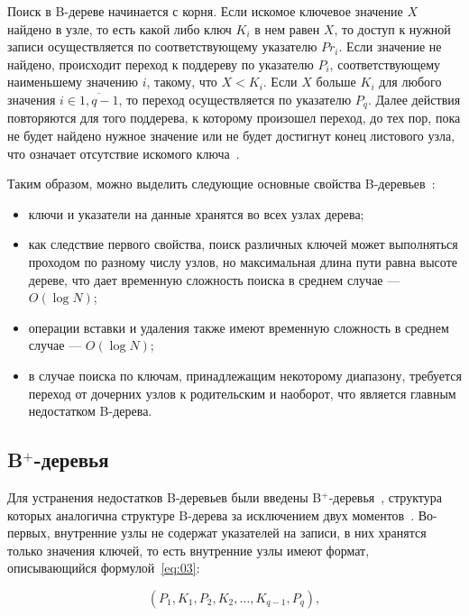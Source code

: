 Поиск в B-дереве начинается с корня. Если искомое ключевое значение $X$ найдено
в узле, то есть какой либо ключ $K_i$ в нем равен $X$, то доступ к нужной записи
осуществляется по соответствующему указателю $Pr_i$. Если значение не найдено,
происходит переход к поддереву по указателю $P_i$, соответствующему наименьшему
значению $i$, такому, что $X < K_i$. Если $X$ больше $K_i$ для любого значения
$i \in \overline{1, q - 1}$, то переход осуществляется по указателю $P_q$.
Далее действия повторяются для того поддерева, к которому произошел переход, до
тех пор, пока не будет найдено нужное значение или не будет достигнут конец
листового узла, что означает отсутствие искомого ключа~\cite{arki}.

Таким образом, можно выделить следующие основные свойства
\mbox{B-деревьев}~\cite{marvel}:
\begin{itemize}
    \item ключи и указатели на данные хранятся во всех узлах дерева;
    \item как следствие первого свойства, поиск различных ключей может
        выполняться проходом по разному числу узлов, но максимальная длина пути
        равна высоте дереве, что дает временную сложность поиска в среднем
        случае --- $O(\log N)$;
    \item операции вставки и удаления также имеют временную сложность в среднем
        случае --- $O(\log N)$;
    \item в случае поиска по ключам, принадлежащим некоторому диапазону,
        требуется переход от дочерних узлов к родительским и наоборот, что
        является главным недостатком B-дерева.
\end{itemize}

\subsection{B$^+$-деревья}

Для устранения недостатков B-деревьев были введены B$^+$-деревья~\cite{marvel},
структура которых аналогична структуре B-дерева за исключением двух
моментов~\cite{arki}.  Во-первых, внутренние узлы не содержат указателей на
записи, в них хранятся только значения ключей, то есть внутренние узлы имеют
формат, описывающийся формулой~\eqref{eq:03}:

\begin{equation}\label{eq:03}
    (P_1, K_1, P_2, K_2, \dots, K_{q-1}, P_q),
\end{equation}

